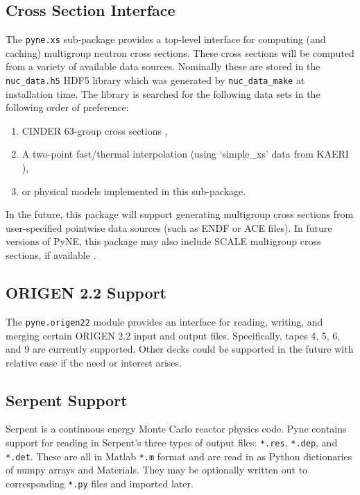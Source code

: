 \documentclass{anstrans}
\begin{document}
\subsection{Cross Section Interface} 
The \texttt{pyne.xs} sub-package provides a top-level interface for computing
(and caching) multigroup neutron cross sections. These cross sections will be
computed from a variety of available data sources.  Nominally these are stored
in the \texttt{nuc\_data.h5} HDF5 library which was generated by
\texttt{nuc\_data\_make} at installation time.  The library is searched for the
following data sets in the following order of preference:

\begin{enumerate}
    \item CINDER 63-group cross sections \cite{cinder},
    \item A two-point fast/thermal interpolation (using `simple\_xs' data from
      KAERI \cite{kaeri}),
    \item or physical models implemented in this sub-package.
\end{enumerate}

In the future, this package will support generating multigroup cross sections
from user-specified pointwise data sources (such as ENDF or ACE files).  In
future versions of PyNE, this package may also include SCALE multigroup cross
sections, if available \cite{scale}.


\subsection{ORIGEN 2.2 Support}
The \texttt{pyne.origen22} module provides an interface for reading, writing,
and merging certain ORIGEN 2.2 \cite{origen} input and output files.
Specifically, tapes 4, 5, 6, and 9 are currently supported.  Other decks could
be supported in the future with relative ease if the need or interest arises.


\subsection{Serpent Support} 
Serpent \cite{serpent} is a continuous energy Monte Carlo reactor physics code.
Pyne contains support for reading in Serpent's three types of output files:
\texttt{*.res}, \texttt{*.dep}, and \texttt{*.det}.  These are all in Matlab
\texttt{*.m} format and are read in as Python dictionaries of numpy arrays and
Materials.  They may be optionally written out to corresponding \texttt{*.py}
files and imported later.
\end{document}
